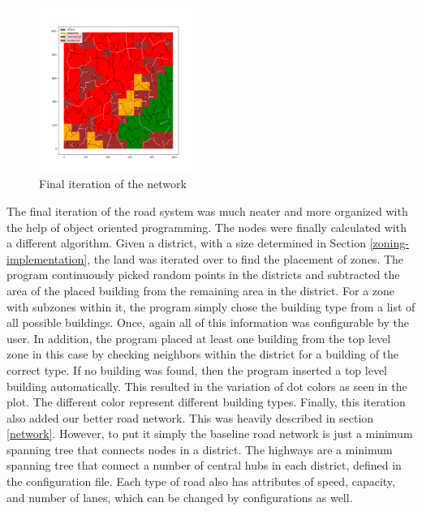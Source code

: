 \documentclass[11pt]{article}
\begin{document}
\begin{multicols}{2}
    \begin{figure}[H]
        \centering
        \includegraphics[width=0.45\textwidth]{images/finalnetwork.png}
        \caption{Final iteration of the network}
        \label{fig:final-network}
    \end{figure}

    \quad The final iteration of the road system was much neater and more organized with the help of object oriented programming. The nodes were finally calculated with a different algorithm. Given a district, with a size determined in Section \ref{zoning-implementation}, the land was iterated over to find the placement of zones. The program continuously picked random points in the districts and subtracted the area of the placed building from the remaining area in the district. For a zone with subzones within it, the program simply chose the building type from a list of all possible buildings. Once, again all of this information was configurable by the user. In addition, the program placed at least one building from the top level zone in this case by checking neighbors within the district for a building of the correct type. If no building was found, then the program inserted a top level building automatically. This resulted in the variation of dot colors as seen in the plot. The different color represent different building types. Finally, this iteration also added our better road network. This was heavily described in section \ref{network}. However, to put it simply the baseline road network is just a minimum spanning tree that connects nodes in a district. The highways are a minimum spanning tree that connect a number of central hubs in each district, defined in the configuration file. Each type of road also has attributes of speed, capacity, and number of lanes, which can be changed by configurations as well. 


\end{multicols}
\end{document}
